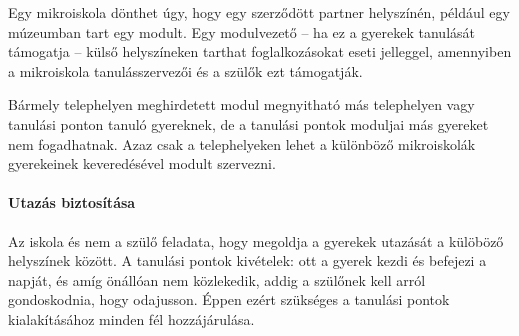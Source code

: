 Egy mikroiskola dönthet úgy, hogy egy szerződött partner helyszínén, például egy múzeumban tart egy modult. Egy modulvezető -- ha ez a gyerekek tanulását támogatja --  külső helyszíneken tarthat foglalkozásokat eseti jelleggel, amennyiben a mikroiskola tanulásszervezői és a szülők ezt támogatják.

\begin{table}[h]
    \begin{center}
    \end{center}
    \label{tbl:tanulasi-helyek}
    \caption{Az iskolai tanulás különböző helyszínei.}
\end{table}

Bármely telephelyen meghirdetett modul megnyitható más telephelyen  vagy tanulási ponton tanuló gyereknek, de a tanulási pontok moduljai más gyereket nem fogadhatnak. Azaz csak a telephelyeken lehet a különböző mikroiskolák gyerekeinek keveredésével modult szervezni.

\paragraph{Utazás biztosítása} Az iskola és nem a szülő feladata, hogy megoldja a gyerekek utazását a külöböző helyszínek között. A tanulási pontok kivételek: ott a gyerek kezdi és befejezi a napját, és amíg önállóan nem közlekedik, addig a szülőnek kell arról gondoskodnia, hogy odajusson. Éppen ezért szükséges a tanulási pontok kialakításához minden fél hozzájárulása.


